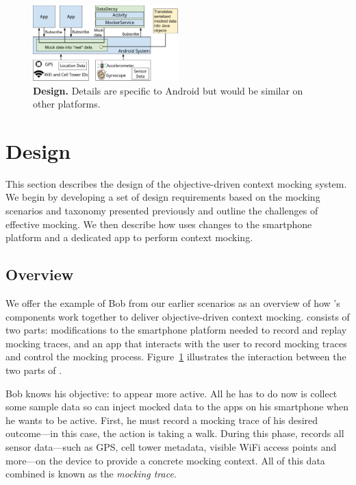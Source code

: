 \begin{figure}[t]
\centering
\includegraphics[width=0.5\textwidth]{./figures/architecture.pdf}

\caption{\textbf{\PocketMocker{} Design.} Details are specific to Android but
would be similar on other platforms.}

\label{fig-design}
\vspace*{-0.2in}
\end{figure}

\section{\PocketMocker{} Design}
\label{sec-design}

This section describes the design of the \PocketMocker{} objective-driven
context mocking system. We begin by developing a set of design requirements
based on the mocking scenarios and taxonomy presented previously and outline
the challenges of effective mocking. We then describe how \PocketMocker{}
uses changes to the smartphone platform and a dedicated app to perform
context mocking.

\subsection{Overview}

We offer the example of Bob from our earlier scenarios as an overview
of how \PocketMocker{}'s components work together to deliver objective-driven
context mocking. \PocketMocker{} consists of two parts:  modifications to the
smartphone platform needed to record and replay mocking traces, and an app
that interacts with the user to record mocking traces and control the mocking
process. Figure~\ref{fig-design} illustrates the interaction between the two
parts of \PocketMocker{}.

Bob knows his objective: to appear more active. All he has to do now is collect
some sample data so \PocketMocker{} can inject mocked data to the apps on his
smartphone when he wants to be active. First, he must record a mocking trace of
his desired outcome---in this case, the action is taking a walk. During this
phase, \PocketMocker{} records all sensor data---such as GPS, cell tower
metadata, visible WiFi access points and more---on the device to provide a
concrete mocking context. All of this data combined is known as the \textit{mocking trace}.

